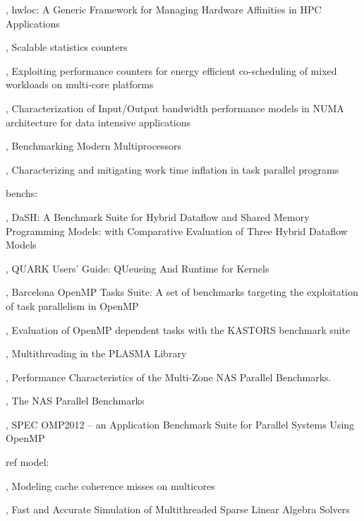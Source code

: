 \cite{Broquedis2010}, hwloc: {A} Generic Framework for Managing Hardware Affinities in {HPC} Applications


\cite{Dice2013}, Scalable statistics counters

\cite{Libutti2014}, Exploiting performance counters for energy efficient co-scheduling of mixed workloads on multi-core platforms

\cite{Li2013}, Characterization of Input/Output bandwidth performance models in NUMA architecture for data intensive applications

\cite{Bienia2011}, Benchmarking Modern Multiprocessors

\cite{Olivier2013}, Characterizing and mitigating work time inflation in task parallel programs

benchs:

\cite{Gajinov2014}, DaSH: A Benchmark Suite for Hybrid Dataflow and Shared Memory Programming Models: with Comparative Evaluation of Three Hybrid Dataflow Models

\cite{YarKhan2011}, QUARK Users' Guide: QUeueing And Runtime for Kernels

\cite{Duran2009}, Barcelona OpenMP Tasks Suite: A set of benchmarks targeting the exploitation of task parallelism in OpenMP

\cite{Virouleau2014}, Evaluation of OpenMP dependent tasks with the KASTORS benchmark suite

\cite{Kurzak2013}, Multithreading in the PLASMA Library

\cite{Jin2004}, Performance Characteristics of the Multi-Zone NAS Parallel Benchmarks.

\cite{Bailey1994}, The NAS Parallel Benchmarks

\cite{Muller2012}, SPEC OMP2012 -- an Application Benchmark Suite for Parallel Systems Using OpenMP


ref model:

\cite{Pan2014}, Modeling cache coherence misses on multicores

\cite{Stanisic2016}, Fast and Accurate Simulation of Multithreaded Sparse Linear Algebra Solvers




